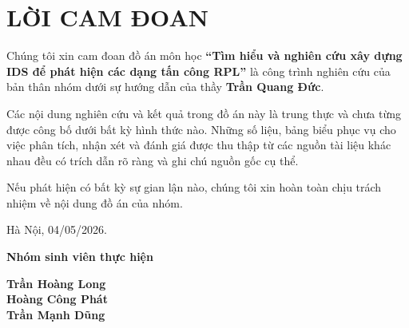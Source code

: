 \section*{LỜI CAM ĐOAN}
{}
\thispagestyle{empty}

Chúng tôi xin cam đoan đồ án môn học \textbf{``Tìm hiểu và nghiên cứu xây dựng IDS
để phát hiện các dạng tấn công RPL''} là công trình nghiên cứu của bản thân nhóm
dưới sự hướng dẫn của thầy \textbf{Trần Quang Đức}.

Các nội dung nghiên cứu và kết quả trong đồ án này là trung thực và chưa từng
được công bố dưới bất kỳ hình thức nào. Những số liệu, bảng biểu phục vụ cho
việc phân tích, nhận xét và đánh giá được thu thập từ các nguồn tài liệu khác
nhau đều có trích dẫn rõ ràng và ghi chú nguồn gốc cụ thể.

Nếu phát hiện có bất kỳ sự gian lận nào, chúng tôi xin hoàn toàn chịu trách nhiệm
về nội dung đồ án của nhóm.

\vspace{1.5cm}
\begin{flushright}
Hà Nội, 04/05/2026.

\vspace{0.5cm}
\textbf{Nhóm sinh viên thực hiện}

\vspace{2cm}
\textbf{Trần Hoàng Long} \\
\textbf{Hoàng Công Phát} \\
\textbf{Trần Mạnh Dũng}
\end{flushright}

\cleardoublepage